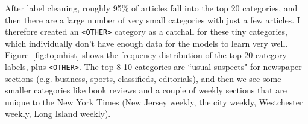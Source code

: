 \documentclass[11pt,a4paper,table]{article}
\begin{document}
\begin{table}
\centering
{}
\caption{Label Cleaning Examples}
\label{tbl:label-clean}
\end{table}

After label cleaning, roughly 95\% of articles fall into the top 20 categories, and then there are a large number of very small categories with just a few articles. I therefore created an \texttt{<OTHER>} category as a catchall for these tiny categories, which individually don't have enough data for the models to learn very well. Figure~\ref{fig:topnhist} shows the frequency distribution of the top 20 category labels, plus \texttt{<OTHER>}. The top 8-10 categories are ``usual suspects" for newspaper sections (e.g. business, sports, classifieds, editorials), and then we see some smaller categories like book reviews and a couple of weekly sections that are unique to the New York Times (New Jersey weekly, the city weekly, Westchester weekly, Long Island weekly).
\end{document}

